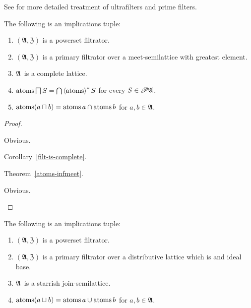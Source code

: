 See \cite{primeidealsandfilters,primefilters} for more detailed treatment
of ultrafilters and prime filters.

\begin{prop}
The following is an implications tuple:
\begin{enumerate}
\item\label{f-atoms-meet-pow} $(\mathfrak{A},\mathfrak{Z})$ is a powerset filtrator.
\item\label{f-atoms-meet-prim} $(\mathfrak{A},\mathfrak{Z})$
  is a primary filtrator over a meet-semilattice with greatest element.
\item\label{f-atoms-meet-slat} $\mathfrak{A}$~is a complete lattice.
\item\label{f-atoms-meet-resx} $\operatorname{atoms}\bigsqcap S=\bigcap\left\langle \operatorname{atoms}\right\rangle ^{\ast}S$ for every $S\in\mathscr{P}\mathfrak{A}$.
\item\label{f-atoms-meet-res} $\operatorname{atoms}(a\sqcap b)=\operatorname{atoms} a\cap\operatorname{atoms} b$ for $a,b\in\mathfrak{A}$.
\end{enumerate}
\end{prop}

\begin{proof}
~
\begin{disorder}
\item[\ref{f-atoms-meet-pow}$\Rightarrow$\ref{f-atoms-meet-prim}] Obvious.
\item[\ref{f-atoms-meet-prim}$\Rightarrow$\ref{f-atoms-meet-slat}] Corollary~\ref{filt-is-complete}.
\item[\ref{f-atoms-meet-slat}$\Rightarrow$\ref{f-atoms-meet-resx}] Theorem~\ref{atoms-infmeet}.
\item[\ref{f-atoms-meet-resx}$\Rightarrow$\ref{f-atoms-meet-res}] Obvious.
\end{disorder}
\end{proof}

\begin{prop}\label{f-atoms-join}
The following is an implications tuple:
\begin{enumerate}
\item\label{f-atoms-join-pow} $(\mathfrak{A},\mathfrak{Z})$ is a powerset filtrator.
\item\label{f-atoms-join-prim} $(\mathfrak{A},\mathfrak{Z})$
  is a primary filtrator over a distributive lattice
  which is and ideal base.
\item\label{f-atoms-join-slat} $\mathfrak{A}$~is a starrish join-semilattice.
\item\label{f-atoms-join-res} $\operatorname{atoms}(a\sqcup b)=\operatorname{atoms} a\cup\operatorname{atoms} b$ for $a,b\in\mathfrak{A}$.
\end{enumerate}
\end{prop}


